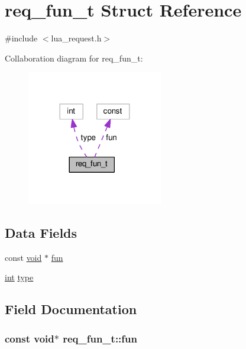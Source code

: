 \hypertarget{structreq__fun__t}{}\section{req\+\_\+fun\+\_\+t Struct Reference}
\label{structreq__fun__t}


{\ttfamily \#include $<$lua\+\_\+request.\+h$>$}



Collaboration diagram for req\+\_\+fun\+\_\+t\+:
\nopagebreak
\begin{figure}[H]
\begin{center}
\leavevmode
\includegraphics[width=168pt]{structreq__fun__t__coll__graph}
\end{center}
\end{figure}
\subsection*{Data Fields}
\begin{DoxyCompactItemize}
\item 
const \hyperlink{group__MOD__ISAPI_gacd6cdbf73df3d9eed42fa493d9b621a6}{void} $\ast$ \hyperlink{structreq__fun__t_a24e781274763395a4722c4e875f1b485}{fun}
\item 
\hyperlink{pcre_8txt_a42dfa4ff673c82d8efe7144098fbc198}{int} \hyperlink{structreq__fun__t_a5bdc94e9ebeba4e594cddf19b7f8da07}{type}
\end{DoxyCompactItemize}


\subsection{Field Documentation}
\subsubsection[{\texorpdfstring{fun}{fun}}]{\setlength{\rightskip}{0pt plus 5cm}const {\bf void}$\ast$ req\+\_\+fun\+\_\+t\+::fun}\hypertarget{structreq__fun__t_a24e781274763395a4722c4e875f1b485}{}\label{structreq__fun__t_a24e781274763395a4722c4e875f1b485}
